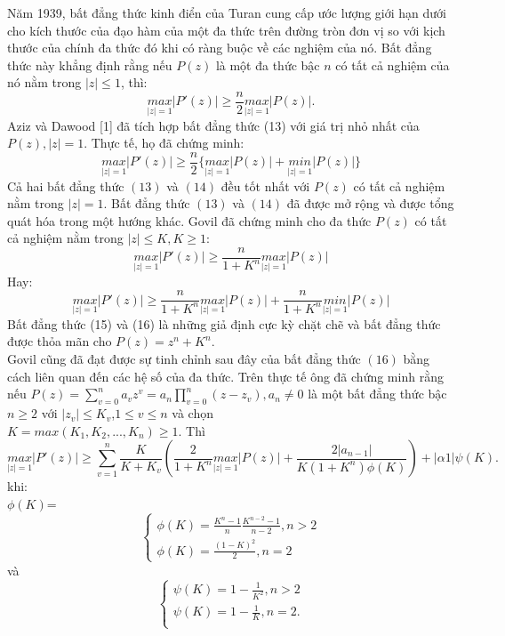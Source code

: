 \documentclass[a5paper,12pt]{report}%
\theoremstyle{definition}
\begin{document}
	Năm 1939, bất đẳng thức kinh điển của Turan cung cấp ước lượng giới hạn dưới cho kích thước của đạo hàm của một đa thức trên đường tròn đơn vị so với kịch thước của chính đa thức đó khi có ràng buộc về các nghiệm của nó. Bất đẳng thức này khẳng định rằng nếu $P(z)$ là một đa thức  bậc $n$ có tất cả nghiệm của nó nằm trong $|z|\le 1$, thì:
	\begin{equation} \label{(8)}
		\underset{|z|=1}{max}|P'(z)|  \ge \frac{n}{2}\underset{|z|=1}{max}|P(z)|.
	\end{equation}
	Aziz và Dawood [1] đã tích hợp bất đẳng thức (13) với giá trị nhỏ nhất của $P(z),|z|=1$. Thực tế, họ đã chứng minh:
	\begin{equation}\label{9}
		\underset{|z|=1}{max}|P'(z)| \ge \frac{n}{2}\{\underset{|z|=1}{max}|P(z)| +\underset{|z|=1}{min}|P(z)| \}
	\end{equation}
	Cả hai bất đẳng thức $(13)$ và $(14)$ đều tốt nhất với $P(z)$ có tất cả nghiệm nằm trong $|z|=1$.
	Bất đẳng thức $(13)$ và $(14)$ đã được mở rộng và được tổng quát hóa trong một hướng khác. Govil \cite{govil1973derivative}  đã chứng minh cho đa thức $P(z)$ có tất cả nghiệm nằm trong $|z|\le K, K \ge 1$:
	\begin{equation}\label{(10)}
		\underset{|z|=1}{max}|P'(z)| \ge \frac{n}{1+K^n}\underset{|z|=1}{max}|P(z)| 
	\end{equation}
	Hay:
	\begin{equation} \label{(11)}
		\underset{|z|=1}{max}|P'(z)| \ge \frac{n}{1+K^n}\underset{|z|=1}{max}|P(z)| +\frac{n}{1+K^n}\underset{|z|=1}{min}|P(z)| 
	\end{equation}
	Bất đẳng  thức (15) và (16) là những giả định cực kỳ chặt chẽ và bất đẳng thức được thỏa mãn cho $P(z)=z^n+K^n.$\\ 
	Govil \cite{govil1990inequalities} cũng đã đạt được sự tinh chỉnh sau đây của bất đẳng thức $(16)$ bằng cách liên quan đến các hệ số của đa thức. Trên thực tế ông đã chứng minh rằng nếu $P(z)=\sum_{v=0}^{n}a_vz^v=a_n\prod_{v=0}^{n}(z-z_v),a_n \ne 0$ là một bất đẳng thức bậc $n \ge 2$ với $|z_v|\le K_v$,$1 \le v \le n$ và chọn \\$K=max(K_1,K_2,...,K_n) \ge 1$. Thì
	\begin{equation} \label{(12)}
		\underset{|z|=1}{max}|P'(z)|  \ge \sum_{v=1}^{n}\frac{K}{K+K_v}\left(\frac{2}{1+K^n}\underset{|z|=1}{max}|P(z)| +\frac{2|a_{n-1}|}{K(1+K^n)\phi(K)}\right)+|\alpha 1|\psi(K).
	\end{equation}
	khi:\\
	$\phi (K)$=
	$$\begin{cases}
		\phi (K)=\frac{K^n-1}{n}\frac{K^{n-2}-1}{n-2}, n>2\\
		\phi (K)=\frac{(1-K)^2}{2}, n=2
	\end{cases}$$
	và\\
	$$\begin{cases}
		\psi (K)=1-\frac{1}{K^2}, n>2\\
		\psi (K)=1-\frac{1}{K}, n=2.\\
	\end{cases}$$
\end{document}
